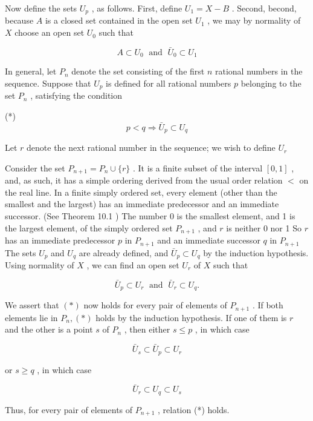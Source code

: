 Now define the sets \({U}_{p}\) , as follows. First, define \({U}_{1} = X - B\) . Second, becond, because \(A\) is a closed set contained in the open set \({U}_{1}\) , we may by normality of \(X\) choose an open set \({U}_{0}\) such that

\[
A \subset  {U}_{0}\;\text{ and }\;{\bar{U}}_{0} \subset  {U}_{1}
\]

In general, let \({P}_{n}\) denote the set consisting of the first \(n\) rational numbers in the sequence. Suppose that \({U}_{p}\) is defined for all rational numbers \(p\) belonging to the set \({P}_{n}\) , satisfying the condition

(*)
\[
p < q \Rightarrow  {\bar{U}}_{p} \subset  {U}_{q}
\]

Let \(r\) denote the next rational number in the sequence; we wish to define \({U}_{r}\)

Consider the set \({P}_{n + 1} = {P}_{n} \cup  \{ r\}\) . It is a finite subset of the interval \(\left\lbrack  {0,1}\right\rbrack\) , and, as such, it has a simple ordering derived from the usual order relation \(<\) on the real line. In a finite simply ordered set, every element (other than the smallest and the largest) has an immediate predecessor and an immediate successor. (See Theorem 10.1 ) The number 0 is the smallest element, and 1 is the largest element, of the simply ordered set \({P}_{n + 1}\) , and \(r\) is neither 0 nor 1 So \(r\) has an immediate predecessor \(p\) in \({P}_{n + 1}\) and an immediate successor \(q\) in \({P}_{n + 1}\) The sets \({U}_{p}\) and \({U}_{q}\) are already defined, and \({\bar{U}}_{p} \subset  {U}_{q}\) by the induction hypothesis. Using normality of \(X\) , we can find an open set \({U}_{r}\) of \(X\) such that

\[
{\bar{U}}_{p} \subset  {U}_{r}\;\text{ and }\;{\bar{U}}_{r} \subset  {U}_{q}.
\]

We assert that \(\left( *\right)\) now holds for every pair of elements of \({P}_{n + 1}\) . If both elements lie in \({P}_{n},\left( *\right)\) holds by the induction hypothesis. If one of them is \(r\) and the other is a point \(s\) of \({P}_{n}\) , then either \(s \leq  p\) , in which case

\[
{\bar{U}}_{s} \subset  {\bar{U}}_{p} \subset  {U}_{r}
\]

or \(s \geq  q\) , in which case

\[
{\bar{U}}_{r} \subset  {U}_{q} \subset  {U}_{s}
\]

Thus, for every pair of elements of \({P}_{n + 1}\) , relation (*) holds.

